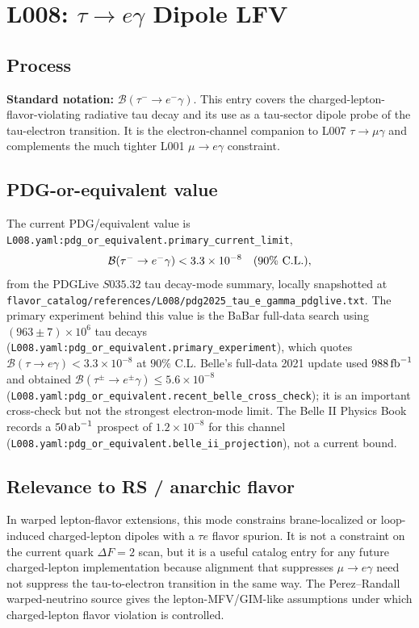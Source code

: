 
\section{L008: \texorpdfstring{\(\tau\to e\gamma\)}{tau -> e gamma} Dipole LFV}

\subsection*{Process}
\textbf{Standard notation:} \(\mathcal{B}(\tau^-\to e^-\gamma)\).
This entry covers the charged-lepton-flavor-violating radiative tau decay and
its use as a tau-sector dipole probe of the tau-electron transition.  It is
the electron-channel companion to L007 \(\tau\to\mu\gamma\) and complements
the much tighter L001 \(\mu\to e\gamma\) constraint.

\subsection*{PDG-or-equivalent value}
The current PDG/equivalent value is
\texttt{L008.yaml:pdg\_or\_equivalent.primary\_current\_limit},
\[
  \mathcal{B}(\tau^-\to e^-\gamma) < 3.3\times10^{-8}
  \quad (90\%\ {\rm C.L.}),
\]
from the PDGLive \(S035.32\) tau decay-mode summary, locally snapshotted at
\texttt{flavor\_catalog/references/L008/pdg2025\_tau\_e\_gamma\_pdglive.txt}.
The primary experiment behind this value is the BaBar full-data search using
\((963\pm7)\times10^6\) tau decays
(\texttt{L008.yaml:pdg\_or\_equivalent.primary\_experiment}), which quotes
\(\mathcal{B}(\tau\to e\gamma)<3.3\times10^{-8}\) at \(90\%\) C.L.  Belle's
full-data 2021 update used \(988\,{\rm fb}^{-1}\) and obtained
\(\mathcal{B}(\tau^\pm\to e^\pm\gamma)\le5.6\times10^{-8}\)
(\texttt{L008.yaml:pdg\_or\_equivalent.recent\_belle\_cross\_check}); it is an
important cross-check but not the strongest electron-mode limit.  The Belle II
Physics Book records a \(50\,{\rm ab}^{-1}\) prospect of
\(1.2\times10^{-8}\) for this channel
(\texttt{L008.yaml:pdg\_or\_equivalent.belle\_ii\_projection}), not a current
bound.

\subsection*{Relevance to RS / anarchic flavor}
In warped lepton-flavor extensions, this mode constrains brane-localized or
loop-induced charged-lepton dipoles with a \(\tau e\) flavor spurion.  It is
not a constraint on the current quark \(\Delta F=2\) scan, but it is a useful
catalog entry for any future charged-lepton implementation because alignment
that suppresses \(\mu\to e\gamma\) need not suppress the tau-to-electron
transition in the same way.  The Perez--Randall warped-neutrino source gives
the lepton-MFV/GIM-like assumptions under which charged-lepton flavor
violation is controlled.

